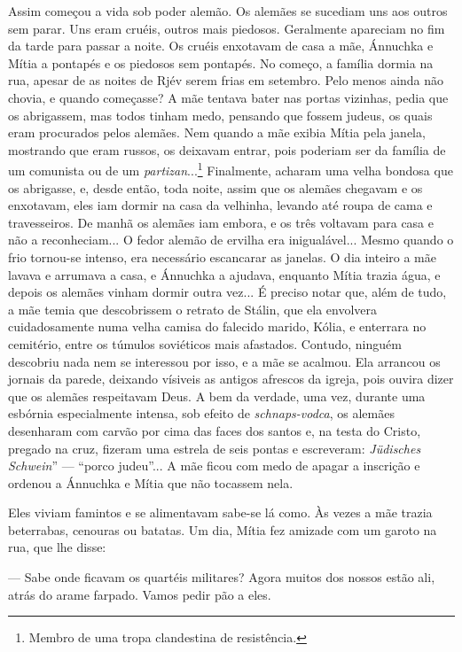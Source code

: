 Assim começou a vida sob poder alemão. Os alemães se sucediam uns aos
outros sem parar. Uns eram cruéis, outros mais piedosos. Geralmente
apareciam no fim da tarde para passar a noite. Os cruéis enxotavam de
casa a mãe, Ánnuchka e Mítia a pontapés e os piedosos sem pontapés. No
começo, a família dormia na rua, apesar de as noites de Rjév serem frias
em setembro. Pelo menos ainda não chovia, e quando começasse? A mãe
tentava bater nas portas vizinhas, pedia que os abrigassem, mas todos
tinham medo, pensando que fossem judeus, os quais eram procurados pelos
alemães. Nem quando a mãe exibia Mítia pela janela, mostrando que eram
russos, os deixavam entrar, pois poderiam ser da família de um comunista
ou de um \emph{partizan}...\footnote{Membro de uma tropa clandestina de
  resistência.} Finalmente, acharam uma velha bondosa que os abrigasse,
e, desde então, toda noite, assim que os alemães chegavam e os
enxotavam, eles iam dormir na casa da velhinha, levando até roupa de
cama e travesseiros. De manhã os alemães iam embora, e os três voltavam
para casa e não a reconheciam... O fedor alemão de ervilha era
inigualável... Mesmo quando o frio tornou-se intenso, era necessário
escancarar as janelas. O dia inteiro a mãe lavava e arrumava a casa, e
Ánnuchka a ajudava, enquanto Mítia trazia água, e depois os alemães
vinham dormir outra vez... É preciso notar que, além de tudo, a mãe
temia que descobrissem o retrato de Stálin, que ela envolvera
cuidadosamente numa velha camisa do falecido marido, Kólia, e enterrara
no cemitério, entre os túmulos soviéticos mais afastados. Contudo,
ninguém descobriu nada nem se interessou por isso, e a mãe se acalmou.
Ela arrancou os jornais da parede, deixando vísiveis as antigos afrescos
da igreja, pois ouvira dizer que os alemães respeitavam Deus. A bem da
verdade, uma vez, durante uma esbórnia especialmente intensa, sob efeito
de \emph{schnaps-vodca}, os alemães desenharam com carvão por cima das
faces dos santos e, na testa do Cristo, pregado na cruz, fizeram uma
estrela de seis pontas e escreveram: \emph{Jüdisches Schwein}'' ---
``porco judeu''... A mãe ficou com medo de apagar a inscrição e ordenou
a Ánnuchka e Mítia que não tocassem nela.

Eles viviam famintos e se alimentavam sabe-se lá como. Às vezes a mãe
trazia beterrabas, cenouras ou batatas. Um dia, Mítia fez amizade com um
garoto na rua, que lhe disse:

--- Sabe onde ficavam os quartéis militares? Agora muitos dos nossos
estão ali, atrás do arame farpado. Vamos pedir pão a eles.


